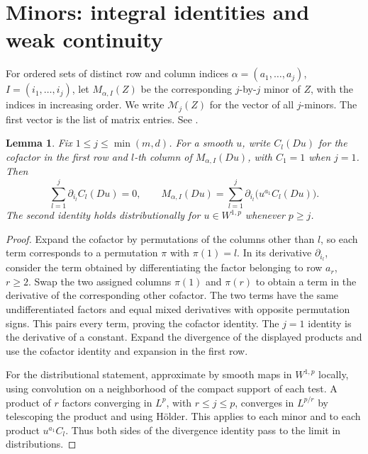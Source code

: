 \documentclass[11pt,oneside,openany]{book}
\theoremstyle{plain}
\newtheorem{lemma}[theorem]{Lemma}
\theoremstyle{definition}
\theoremstyle{remark}
\begin{document}
\section{Minors: integral identities and weak continuity}
\label{v08-05}

For ordered sets of distinct row and column indices
\(\alpha=(a_1,\ldots,a_j)\), \(I=(i_1,\ldots,i_j)\), let
\(M_{\alpha,I}(Z)\) be the corresponding \(j\)-by-\(j\) minor
of \(Z\), with the indices in increasing order. We write
\(\mathcal M_j(Z)\) for the vector of all \(j\)-minors.
The first vector is the list of matrix entries.
See \cite[Lemma 3.26 and Remark 3.23]{Dacorogna}.

\begin{lemma}\label{lem:minor-divergence}
Fix \(1\le j\le \min(m,d)\). For a smooth \(u\), write \(C_l(Du)\)
for the cofactor in the first row and \(l\)-th column of
\(M_{\alpha,I}(Du)\), with \(C_1=1\) when \(j=1\). Then
\[
 \sum_{l=1}^j\partial_{i_l}C_l(Du)=0,\qquad
 M_{\alpha,I}(Du)
   =\sum_{l=1}^j\partial_{i_l}\bigl(u^{a_1}C_l(Du)\bigr).
\]
The second identity holds distributionally for \(u\in W^{1,p}\)
whenever \(p\ge j\).
\end{lemma}

\begin{proof}
Expand the cofactor by permutations of the columns other than
\(l\), so each term corresponds to a permutation \(\pi\) with
\(\pi(1)=l\). In its derivative \(\partial_{i_l}\), consider
the term obtained by differentiating the factor belonging to
row \(a_r\), \(r\ge2\). Swap the two assigned columns
\(\pi(1)\) and \(\pi(r)\) to obtain a term in the derivative
of the corresponding other cofactor. The two terms have the
same undifferentiated factors and equal mixed derivatives
with opposite permutation signs. This pairs every term, proving
the cofactor identity. The \(j=1\) identity is the derivative
of a constant. Expand the divergence of the displayed products
and use the cofactor identity and expansion in the first row.

For the distributional statement, approximate by smooth maps
in \(W^{1,p}\) locally, using convolution on a neighborhood of
the compact support of each test. A product of \(r\) factors
converging in \(L^p\), with \(r\le j\le p\), converges in
\(L^{p/r}\) by telescoping the product and using H\"older.
This applies to each minor and to each product \(u^{a_1}C_l\).
Thus both sides of the divergence identity pass to the limit
in distributions.
\end{proof}
\end{document}
